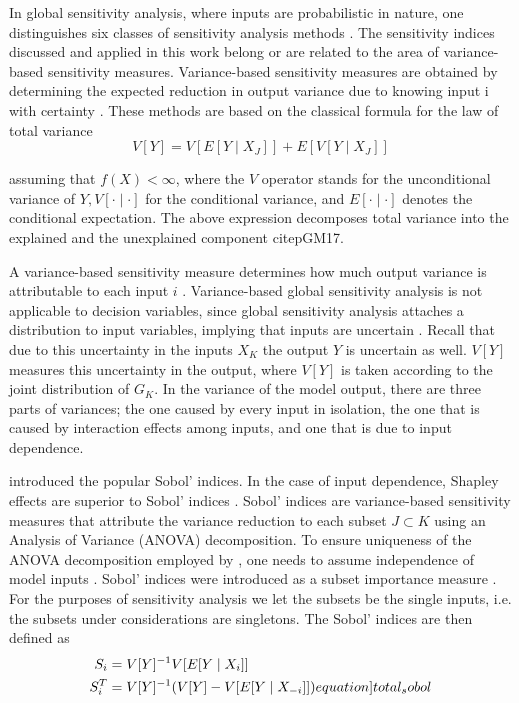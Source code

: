 In global sensitivity analysis, where inputs are probabilistic in nature, one distinguishes six classes of sensitivity analysis methods \citep{BP16}. The sensitivity indices discussed and applied in this work belong or are related to the area of variance-based sensitivity measures. Variance-based sensitivity measures are obtained by determining the expected reduction in output variance due to knowing input i with certainty \citep{BP16}. These methods are based on the classical formula for the law of total variance
\begin{equation}
V[Y]= V[E[Y \mid X_J]] + E[V[Y \mid X_J]]
\end{equation}

\noindent assuming that $f(X) < \infty$, where the $V$ operator stands for the unconditional variance of $Y, V[\cdot \mid \cdot]$ for the conditional variance, and $E[\cdot \mid \cdot]$ denotes the conditional expectation. The above expression decomposes total variance into the explained and the unexplained component citep{GM17}.

A variance-based sensitivity measure determines how much output variance is attributable to each input $i$ \citep{BP16}. Variance-based global sensitivity analysis is not applicable to decision variables, since global sensitivity analysis attaches a distribution to input variables, implying that inputs are uncertain \citep{SNS16}. Recall that due to this uncertainty in the inputs $X_K$ the output $Y$ is uncertain as well. $V[Y]$ measures this uncertainty in the output, where $V[Y]$ is taken according to the joint distribution of $G_K$. In the variance of the model output, there are three parts of variances; the one caused by every input in isolation, the one that is caused by interaction effects among inputs, and one that is due to input dependence.

\citet{S93} introduced the popular Sobol' indices. In the case of input dependence, Shapley effects are superior to Sobol' indices \citep{O14}. Sobol' indices are variance-based sensitivity measures that attribute the variance reduction to each subset $J \subset K$ using an Analysis of Variance (ANOVA) decomposition. To ensure uniqueness of the ANOVA decomposition employed by \citet{S53}, one needs to assume independence of model inputs \citep{GM17}. Sobol' indices were introduced as a subset importance measure \citep{SNS16}. For the purposes of sensitivity analysis we let the subsets be the single inputs, i.e. the subsets under considerations are singletons. The Sobol' indices are then defined as
\begin{align}
S_i &= V[Y]^{-1} V[E[Y \mid X_i]]\\
S_i^T &= V[Y]^{-1}(V[Y] - V[E[Y \mid {X_{- i}}]])
\label[equation]{total_sobol}
\end{align}

